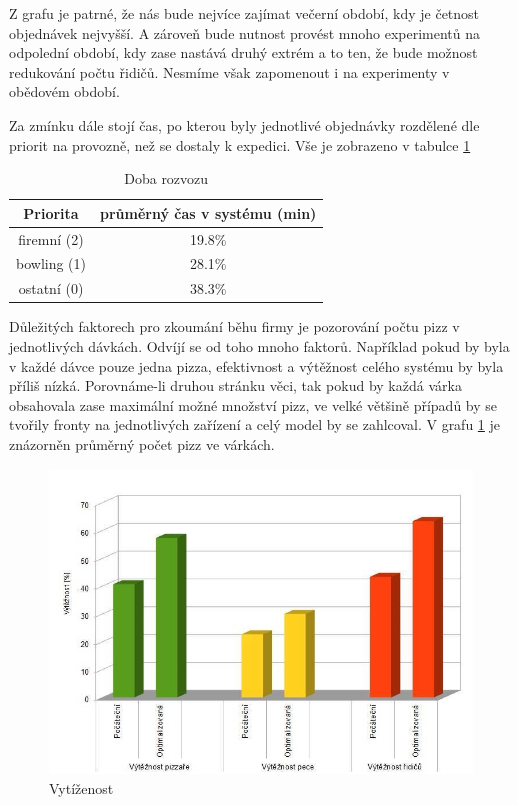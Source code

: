 \documentclass[a4paper, 12pt]{article}[9.12.2013]
\begin{document}
Z grafu je patrné, že nás bude nejvíce zajímat večerní období, kdy je četnost
objednávek nejvyšší. A zároveň bude nutnost provést mnoho experimentů na
odpolední období, kdy zase nastává druhý extrém a to ten, že bude možnost
redukování počtu řidičů. Nesmíme však zapomenout i na experimenty v obědovém
období.

Za zmínku dále stojí čas, po kterou byly jednotlivé objednávky rozdělené dle
priorit na provozně, než se dostaly k expedici. Vše je zobrazeno v tabulce \ref{tab:doba}

\begin{table}[h]
\centering
\begin{tabular}{ c | c }
    Priorita & průměrný čas v systému (min)\\
    \hline
    firemní (2) & 19.8\%\\
    bowling (1) & 28.1\%\\
    ostatní (0) & 38.3\%\\
\end{tabular}
\caption{Doba rozvozu}
\label {tab:doba}
\end{table}

Důležitých faktorech pro zkoumání běhu firmy je pozorování počtu pizz v
jednotlivých dávkách. Odvíjí se od toho mnoho faktorů. Například pokud by byla
v každé dávce pouze jedna pizza, efektivnost a výtěžnost celého systému by byla
příliš nízká. Porovnáme-li druhou stránku věci, tak pokud by každá várka
obsahovala zase maximální možné množství pizz, ve velké většině případů by se
tvořily fronty na jednotlivých zařízení a celý model by se zahlcoval. V grafu \ref{fig:2} je znázorněn průměrný počet pizz ve várkách.

\begin{figure}[h]
    \centering
    \includegraphics[width=\textwidth,height=\textheight,keepaspectratio]{2.jpg}
    \caption{Vytíženost}
    \label{fig:2}
\end{figure}
\end{document}
